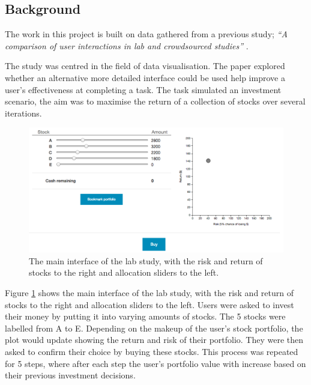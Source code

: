 \documentclass{article}
\begin{document}

\subsection{Background}


The work in this project is built on data gathered from a previous study;
\textit{``A comparison of user interactions in lab and crowdsourced
studies''} \cite{gruber2017thesis}.

The study was centred in the field of data visualisation.
The paper explored whether an alternative more detailed interface could be used help improve a user's effectiveness at completing a task.
The task simulated an investment scenario, the aim was to maximise the return of a collection of stocks over several iterations. 

\begin{figure}[ht]
    \centering
    \includegraphics[scale=0.35, frame]{Images/interface.png}
    \caption{The main interface of the lab study, with the risk and return of stocks to the right and allocation sliders to the left.}
    \label{fig:interface}
\end{figure}

Figure \ref{fig:interface} shows the main interface of the lab study, with the risk and return of stocks to the right and allocation sliders to the left.
Users were asked to invest their money by putting it into varying amounts of stocks.
The 5 stocks were labelled from A to E.
Depending on the makeup of the user's stock portfolio, the plot would update showing the return and risk of their portfolio.
They were then asked to confirm their choice by buying these stocks.
This process was repeated for 5 steps, where after each step the user's portfolio value with increase based on their previous investment decisions. 
\end{document}
